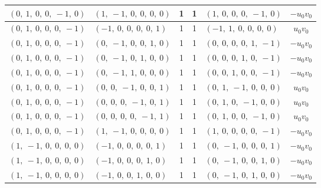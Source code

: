 \documentclass[11pt]{article}
\theoremstyle{definition}
\begin{document}
\begin{longtable}{|l|l|c|c|l|c|}
    \hline
    $\left( 0, \  1, \  0, \  0, \  -1, \  0\right)$ & $\left( 1, \  -1, \  0, \  0, \  0, \  0\right)$ & 1 & 1 & $\left( 1, \  0, \  0, \  0, \  -1, \  0\right)$ & $- u_{0} v_{0}$ \\
    \hline
    $\left( 0, \  1, \  0, \  0, \  0, \  -1\right)$ & $\left( -1, \  0, \  0, \  0, \  0, \  1\right)$ & 1 & 1 & $\left( -1, \  1, \  0, \  0, \  0, \  0\right)$ & $u_{0} v_{0}$ \\
    \hline
    $\left( 0, \  1, \  0, \  0, \  0, \  -1\right)$ & $\left( 0, \  -1, \  0, \  0, \  1, \  0\right)$ & 1 & 1 & $\left( 0, \  0, \  0, \  0, \  1, \  -1\right)$ & $- u_{0} v_{0}$ \\
    \hline
    $\left( 0, \  1, \  0, \  0, \  0, \  -1\right)$ & $\left( 0, \  -1, \  0, \  1, \  0, \  0\right)$ & 1 & 1 & $\left( 0, \  0, \  0, \  1, \  0, \  -1\right)$ & $- u_{0} v_{0}$ \\
    \hline
    $\left( 0, \  1, \  0, \  0, \  0, \  -1\right)$ & $\left( 0, \  -1, \  1, \  0, \  0, \  0\right)$ & 1 & 1 & $\left( 0, \  0, \  1, \  0, \  0, \  -1\right)$ & $- u_{0} v_{0}$ \\
    \hline
    $\left( 0, \  1, \  0, \  0, \  0, \  -1\right)$ & $\left( 0, \  0, \  -1, \  0, \  0, \  1\right)$ & 1 & 1 & $\left( 0, \  1, \  -1, \  0, \  0, \  0\right)$ & $u_{0} v_{0}$ \\
    \hline
    $\left( 0, \  1, \  0, \  0, \  0, \  -1\right)$ & $\left( 0, \  0, \  0, \  -1, \  0, \  1\right)$ & 1 & 1 & $\left( 0, \  1, \  0, \  -1, \  0, \  0\right)$ & $u_{0} v_{0}$ \\
    \hline
    $\left( 0, \  1, \  0, \  0, \  0, \  -1\right)$ & $\left( 0, \  0, \  0, \  0, \  -1, \  1\right)$ & 1 & 1 & $\left( 0, \  1, \  0, \  0, \  -1, \  0\right)$ & $u_{0} v_{0}$ \\
    \hline
    $\left( 0, \  1, \  0, \  0, \  0, \  -1\right)$ & $\left( 1, \  -1, \  0, \  0, \  0, \  0\right)$ & 1 & 1 & $\left( 1, \  0, \  0, \  0, \  0, \  -1\right)$ & $- u_{0} v_{0}$ \\
    \hline
    $\left( 1, \  -1, \  0, \  0, \  0, \  0\right)$ & $\left( -1, \  0, \  0, \  0, \  0, \  1\right)$ & 1 & 1 & $\left( 0, \  -1, \  0, \  0, \  0, \  1\right)$ & $- u_{0} v_{0}$ \\
    \hline
    $\left( 1, \  -1, \  0, \  0, \  0, \  0\right)$ & $\left( -1, \  0, \  0, \  0, \  1, \  0\right)$ & 1 & 1 & $\left( 0, \  -1, \  0, \  0, \  1, \  0\right)$ & $- u_{0} v_{0}$ \\
    \hline
    $\left( 1, \  -1, \  0, \  0, \  0, \  0\right)$ & $\left( -1, \  0, \  0, \  1, \  0, \  0\right)$ & 1 & 1 & $\left( 0, \  -1, \  0, \  1, \  0, \  0\right)$ & $- u_{0} v_{0}$ \\

\end{longtable}
\end{document}
